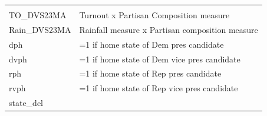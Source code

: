 \documentclass[]{book}
\begin{document}
\begin{longtable}[]{@{}ll@{}}
\begin{minipage}[t]{0.89\columnwidth}
\end{minipage}\tabularnewline
\begin{minipage}[t]{0.05\columnwidth}\raggedright\strut
TO\_DVS23MA\strut
\end{minipage} & \begin{minipage}[t]{0.89\columnwidth}\raggedright\strut
Turnout x Partisan Composition measure\strut
\end{minipage}\tabularnewline
\begin{minipage}[t]{0.05\columnwidth}\raggedright\strut
Rain\_DVS23MA\strut
\end{minipage} & \begin{minipage}[t]{0.89\columnwidth}\raggedright\strut
Rainfall measure x Partisan composition measure\strut
\end{minipage}\tabularnewline
\begin{minipage}[t]{0.05\columnwidth}\raggedright\strut
dph\strut
\end{minipage} & \begin{minipage}[t]{0.89\columnwidth}\raggedright\strut
=1 if home state of Dem pres candidate\strut
\end{minipage}\tabularnewline
\begin{minipage}[t]{0.05\columnwidth}\raggedright\strut
dvph\strut
\end{minipage} & \begin{minipage}[t]{0.89\columnwidth}\raggedright\strut
=1 if home state of Dem vice pres candidate\strut
\end{minipage}\tabularnewline
\begin{minipage}[t]{0.05\columnwidth}\raggedright\strut
rph\strut
\end{minipage} & \begin{minipage}[t]{0.89\columnwidth}\raggedright\strut
=1 if home state of Rep pres candidate\strut
\end{minipage}\tabularnewline
\begin{minipage}[t]{0.05\columnwidth}\raggedright\strut
rvph\strut
\end{minipage} & \begin{minipage}[t]{0.89\columnwidth}\raggedright\strut
=1 if home state of Rep vice pres candidate\strut
\end{minipage}\tabularnewline
\begin{minipage}[t]{0.05\columnwidth}\raggedright\strut
state\_del\strut
\end{minipage} & \begin{minipage}[t]{0.89\columnwidth}\raggedright\strut

\end{minipage}
\end{longtable}
\end{document}
